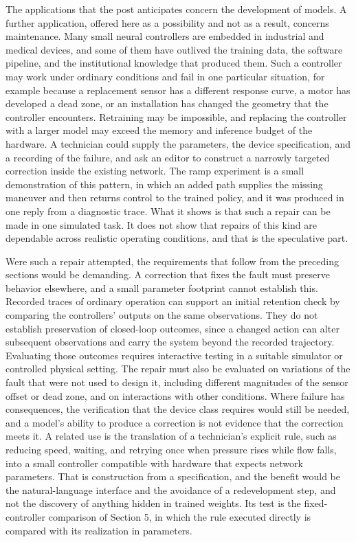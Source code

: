 \documentclass[11pt]{article}
\begin{document}
The applications that the post anticipates concern the development of models. A further application, offered here as a possibility and not as a result, concerns maintenance. Many small neural controllers are embedded in industrial and medical devices, and some of them have outlived the training data, the software pipeline, and the institutional knowledge that produced them. Such a controller may work under ordinary conditions and fail in one particular situation, for example because a replacement sensor has a different response curve, a motor has developed a dead zone, or an installation has changed the geometry that the controller encounters. Retraining may be impossible, and replacing the controller with a larger model may exceed the memory and inference budget of the hardware. A technician could supply the parameters, the device specification, and a recording of the failure, and ask an editor to construct a narrowly targeted correction inside the existing network. The ramp experiment is a small demonstration of this pattern, in which an added path supplies the missing maneuver and then returns control to the trained policy, and it was produced in one reply from a diagnostic trace. What it shows is that such a repair can be made in one simulated task. It does not show that repairs of this kind are dependable across realistic operating conditions, and that is the speculative part.

Were such a repair attempted, the requirements that follow from the preceding sections would be demanding. A correction that fixes the fault must preserve behavior elsewhere, and a small parameter footprint cannot establish this. Recorded traces of ordinary operation can support an initial retention check by comparing the controllers' outputs on the same observations. They do not establish preservation of closed-loop outcomes, since a changed action can alter subsequent observations and carry the system beyond the recorded trajectory. Evaluating those outcomes requires interactive testing in a suitable simulator or controlled physical setting. The repair must also be evaluated on variations of the fault that were not used to design it, including different magnitudes of the sensor offset or dead zone, and on interactions with other conditions. Where failure has consequences, the verification that the device class requires would still be needed, and a model's ability to produce a correction is not evidence that the correction meets it. A related use is the translation of a technician's explicit rule, such as reducing speed, waiting, and retrying once when pressure rises while flow falls, into a small controller compatible with hardware that expects network parameters. That is construction from a specification, and the benefit would be the natural-language interface and the avoidance of a redevelopment step, and not the discovery of anything hidden in trained weights. Its test is the fixed-controller comparison of Section 5, in which the rule executed directly is compared with its realization in parameters.
\end{document}
